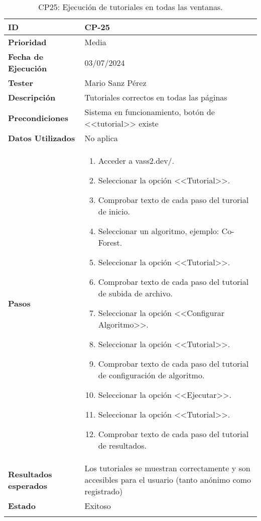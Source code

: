 \begin{longtable}{>{\raggedright\arraybackslash}p{4cm} p{9.5cm}}
    \hline
    \rowcolor{gray!20}
    \textbf{ID} & CP-25\\
    \hline
    \rowcolor{white}
    \textbf{Prioridad} & Media \\
    \hline
    \rowcolor{gray!20}
    \textbf{Fecha de Ejecución} & 03/07/2024 \\
    \hline
    \rowcolor{white}
    \textbf{Tester} & Mario Sanz Pérez \\
    \hline
    \rowcolor{gray!20}
    \textbf{Descripción} & Tutoriales correctos en todas las páginas\\
    \hline
    \rowcolor{white}
    \textbf{Precondiciones} & Sistema en funcionamiento, botón de <<tutorial>> existe\\
    \hline
    \rowcolor{white}
    \textbf{Datos Utilizados} & No aplica\\
    \hline
    \rowcolor{gray!20}
    \textbf{Pasos} & \begin{enumerate}
        \item Acceder a vass2.dev/.
        \item Seleccionar la opción <<Tutorial>>.
        \item Comprobar texto de cada paso del turorial de inicio.
        \item Seleccionar un algoritmo, ejemplo: Co-Forest.
        \item Seleccionar la opción <<Tutorial>>.
        \item Comprobar texto de cada paso del tutorial de subida de archivo.
        \item Seleccionar la opción <<Configurar Algoritmo>>.
        \item Seleccionar la opción <<Tutorial>>.
        \item Comprobar texto de cada paso del tutorial de configuración de algoritmo.
        \item Seleccionar la opción <<Ejecutar>>.
        \item Seleccionar la opción <<Tutorial>>.
        \item Comprobar texto de cada paso del tutorial de resultados.
    \end{enumerate}\\
	\hline
    \rowcolor{gray!20}
    \textbf{Resultados esperados} & Los tutoriales se muestran correctamente y son accesibles para el usuario (tanto anónimo como registrado)\\
    \hline
    \rowcolor{white}
    \textbf{Estado} & Exitoso\\
    \hline
	\caption[CP25: Ejecución de tutoriales]{CP25: Ejecución de tutoriales en todas las ventanas.}
\end{longtable}

